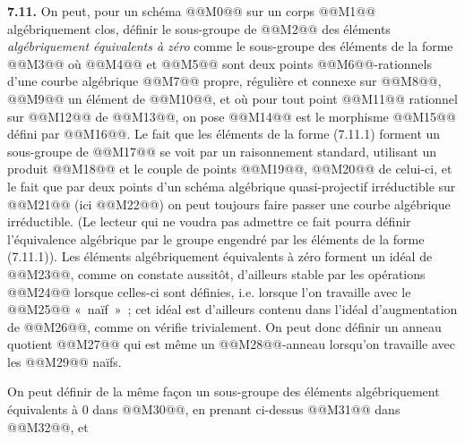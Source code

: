 
\textbf{7.11.} On peut, pour un schéma @@M0@@ sur un corps @@M1@@ algébriquement clos, définir le sous-groupe de @@M2@@ des éléments \emph{algébriquement équivalents à zéro} comme le sous-groupe des éléments de la forme
@@M3@@
où @@M4@@ et @@M5@@ sont deux points @@M6@@-rationnels d'une courbe algébrique @@M7@@ propre, régulière et connexe sur @@M8@@, @@M9@@ un élément de @@M10@@, et où pour tout point @@M11@@ rationnel sur @@M12@@ de @@M13@@, on pose
@@M14@@
est le morphisme @@M15@@ défini par @@M16@@. Le fait que les éléments de la forme (7.11.1) forment un sous-groupe de @@M17@@ se voit par un raisonnement standard, utilisant un produit @@M18@@ et le couple de points @@M19@@, @@M20@@ de celui-ci, et le fait que par deux points d'un schéma algébrique quasi-projectif irréductible sur @@M21@@ (ici @@M22@@) on peut toujours faire passer une courbe algébrique irréductible. (Le lecteur qui ne voudra pas admettre ce fait pourra définir l'équivalence algébrique par le groupe engendré par les éléments de la forme (7.11.1)). Les éléments algébriquement équivalents à zéro forment un idéal de @@M23@@, comme on constate aussitôt, d'ailleurs stable par les opérations @@M24@@ lorsque celles-ci sont définies, i.e. lorsque l'on travaille avec le @@M25@@ «~naïf~»~; cet idéal est d'ailleurs contenu dans l'idéal d'augmentation de @@M26@@, comme on vérifie trivialement. On peut donc définir un anneau quotient
@@M27@@
qui est même un @@M28@@-anneau lorsqu'on travaille avec les @@M29@@ naïfs.

On peut définir de la même façon un sous-groupe des éléments algébriquement équivalents à 0 dans @@M30@@, en prenant ci-dessus @@M31@@ dans @@M32@@, et
